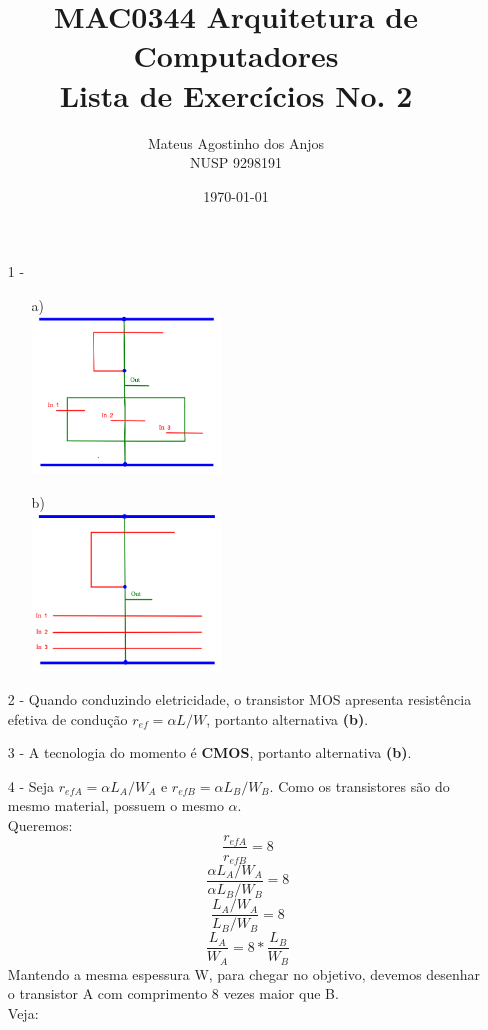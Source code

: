 \documentclass[12pt]{article}
\title{MAC0344 Arquitetura de Computadores\\
Lista de Exercícios No. 2
}
\author{Mateus Agostinho dos Anjos\\NUSP 9298191}
\date{\today}
\begin{document}
	\maketitle
	\begin{itemize}
		\item[1 -]
			\hfill\\
			\begin{itemize}
				\item[a)]
					\hfill \\
					\includegraphics[width=5cm]{porta_NOR_3_entradas.png}
				\item[b)]
					\hfill \\
					\includegraphics[width=5cm]{porta_NAND_3_entradas.png}
			\end{itemize}
		\item[2 -]
			Quando conduzindo eletricidade, o transistor MOS apresenta
			resistência efetiva de condução $r_{ef} = \alpha L/W$,
			portanto alternativa \textbf{(b)}.
		\item[3 -]
			A tecnologia do momento é \textbf{CMOS}, portanto
			alternativa \textbf{(b)}.
		\item[4 -]
			Seja $r_{efA} = \alpha L_A/W_A$ e $r_{efB} = \alpha L_B/W_B$.
			Como os transistores são do mesmo material, possuem o mesmo
			$\alpha$.\\
			Queremos:
			$$\frac{r_{efA}}{r_{efB}} = 8$$
			$$\frac{\alpha L_A/W_A}{\alpha L_B/W_B} = 8$$
			$$\frac{L_A/W_A}{L_B/W_B} = 8$$
			$$\frac{L_A}{W_A} = 8 * \frac{L_B}{W_B}$$
			Mantendo a mesma espessura W, para chegar no objetivo, devemos
			desenhar o transistor A com comprimento 8 vezes maior que
			B.\\
			Veja:

\end{itemize}
\end{document}
